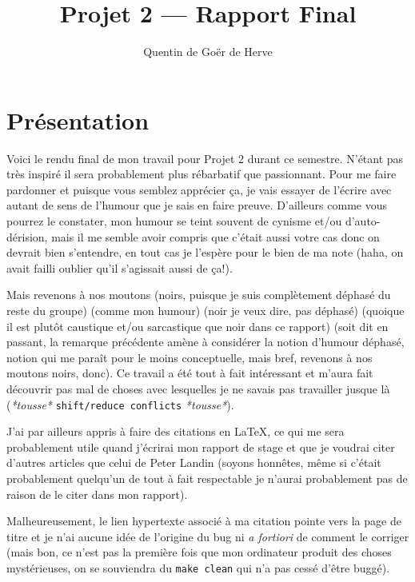 \documentclass[12pt,a4paper]{report}
\author{Quentin de Goër de Herve}
\title{Projet 2 --- Rapport Final}
\date{}
\begin{document}
\maketitle

\tableofcontents{}

\chapter*{Présentation}

Voici le rendu final de mon travail pour Projet 2 durant ce semestre. N'étant pas très inspiré il sera probablement plus rébarbatif que passionnant. Pour me faire pardonner et puisque vous semblez apprécier ça, je vais essayer de l'écrire avec autant de sens de l'humour que je sais en faire preuve. D'ailleurs comme vous pourrez le constater, mon humour se teint souvent de cynisme et/ou d'auto-dérision, mais il me semble avoir compris que c'était aussi votre cas donc on devrait bien s'entendre, en tout cas je l'espère pour le bien de ma note (haha, on avait failli oublier qu'il s'agissait aussi de ça!).

Mais revenons à nos moutons (noirs, puisque je suis complètement déphasé du reste du groupe) (comme mon humour) (noir je veux dire, pas déphasé) (quoique il est plutôt caustique et/ou sarcastique que noir dans ce rapport) (soit dit en passant, la remarque précédente amène à considérer la notion d'humour déphasé, notion qui me paraît pour le moins conceptuelle, mais bref, revenons à nos moutons noirs, donc). Ce travail a été tout à fait intéressant et m'aura fait découvrir pas mal de choses avec lesquelles je ne savais pas travailler jusque là (\emph{*tousse*} \verb?shift/reduce conflicts? \emph{*tousse*}).

J'ai par ailleurs appris à faire des citations en \LaTeX , ce qui me sera probablement utile quand j'écrirai mon rapport de stage et que je voudrai citer d'autres articles que celui de Peter Landin \cite{DBLP:journals/cacm/Landin66} (soyons honnêtes, même si c'était probablement quelqu'un de tout à fait respectable je n'aurai probablement pas de raison de le citer dans mon rapport).

Malheureusement, le lien hypertexte associé à ma citation pointe vers la page de titre et je n'ai aucune idée de l'origine du bug ni \emph{a fortiori} de comment le corriger (mais bon, ce n'est pas la première fois que mon ordinateur produit des choses mystérieuses, on se souviendra du \verb?make clean? qui n'a pas cessé d'être buggé).
\end{document}
